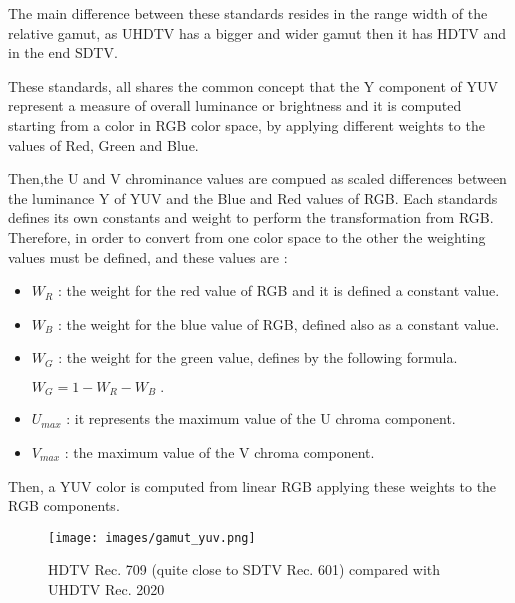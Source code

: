 \documentclass[12pt,a4paper]{extarticle}
\begin{document}
The main difference between these standards resides in the range width of the relative gamut, as UHDTV has a bigger and wider gamut then it has HDTV and in the end SDTV.

These standards, all shares the common concept that the Y component of YUV represent a measure of overall luminance or brightness and it is computed starting from a color in RGB color space, by applying different weights to the values of Red, Green and Blue.

Then,the U and V chrominance values are compued as scaled differences between the luminance Y of YUV and the Blue and Red values of RGB.
Each standards defines its own constants and weight to perform the transformation from RGB.
Therefore, in order to convert from one color space to the other the weighting values must be defined, and these values are :
\begin{itemize}
\item $W_{R}$ : the weight for the red value of RGB and it is defined a constant value.
\item $W_{B}$ : the weight for the blue value of RGB, defined also as a constant value.
\item $W_{G}$ : the weight for the green value, defines by the following formula.
\begin{center}
$W_{G}=1-W_{R}-W_{B} \;.$ 
\end{center}
\item $U_{max}$ : it represents the maximum value of the U chroma component.
\item $V_{max}$ : the maximum value of the V chroma component.
\end{itemize}
Then, a YUV color is computed from linear RGB %
applying these weights to the RGB components.

\begin{figure}[hbtp]
\centering
\texttt{[image: images/gamut\_yuv.png]}
\caption{HDTV Rec. 709 (quite close to SDTV Rec. 601) compared with UHDTV Rec. 2020} 
\end{figure}
\end{document}
